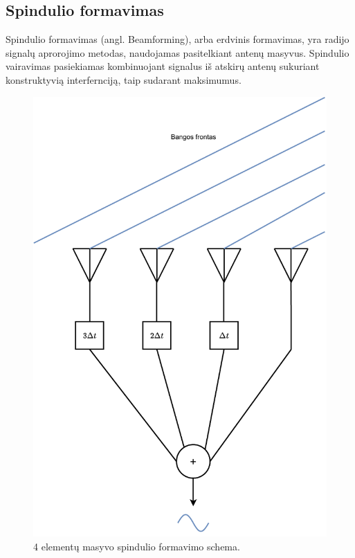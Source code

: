 \documentclass[main.tex]{subfiles}
\begin{document}
\subsection{Spindulio formavimas}

Spindulio formavimas (angl. Beamforming), arba erdvinis formavimas, yra radijo signalų aprorojimo metodas,
naudojamas pasitelkiant antenų masyvus. Spindulio vairavimas pasiekiamas kombinuojant
signalus iš atskirų antenų sukuriant konstruktyvią interfernciją, taip sudarant
maksimumus.

\begin{figure}[h]
    \begin{centering}
    \includegraphics[scale=0.5]{drawings/simple_steering}
    \par\end{centering}
    \protect\caption{\label{fig:simple_steering}4 elementų masyvo spindulio formavimo schema.}
\end{figure}
\end{document}
